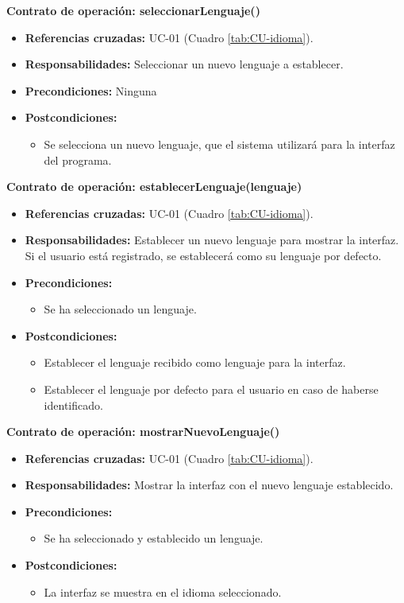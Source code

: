 \textbf{Contrato de operación: seleccionarLenguaje()}
\begin{itemize}
\item \textbf{Referencias cruzadas:} UC-01 (Cuadro \ref{tab:CU-idioma}).
\item \textbf{Responsabilidades:} Seleccionar un nuevo lenguaje a establecer.
\item \textbf{Precondiciones:} Ninguna
\item \textbf{Postcondiciones:}
 \begin{itemize}
\item Se selecciona un nuevo lenguaje, que el sistema utilizará para la interfaz del programa.
\end {itemize}
\end {itemize}

\textbf{Contrato de operación: establecerLenguaje(lenguaje)}
\begin{itemize}
\item \textbf{Referencias cruzadas:} UC-01 (Cuadro \ref{tab:CU-idioma}).
\item \textbf{Responsabilidades:} Establecer un nuevo lenguaje para mostrar la interfaz. Si el usuario está registrado, se establecerá como su lenguaje por defecto.
\item \textbf{Precondiciones:} 
 \begin{itemize}
\item Se ha seleccionado un lenguaje.
\end {itemize}
\item \textbf{Postcondiciones:} 
 \begin{itemize}
\item Establecer el lenguaje recibido como lenguaje para la interfaz.
\item Establecer el lenguaje por defecto para el usuario en caso de haberse identificado.
\end {itemize}
\end {itemize}


\textbf{Contrato de operación: mostrarNuevoLenguaje()}
\begin{itemize}
\item \textbf{Referencias cruzadas:} UC-01 (Cuadro \ref{tab:CU-idioma}).
\item \textbf{Responsabilidades:} Mostrar la interfaz con el nuevo lenguaje establecido.
\item \textbf{Precondiciones:} 
 \begin{itemize}
\item Se ha seleccionado y establecido un lenguaje.
\end {itemize}
\item \textbf{Postcondiciones:} 
 \begin{itemize}
\item La interfaz se muestra en el idioma seleccionado.
\end {itemize}
\end {itemize}

